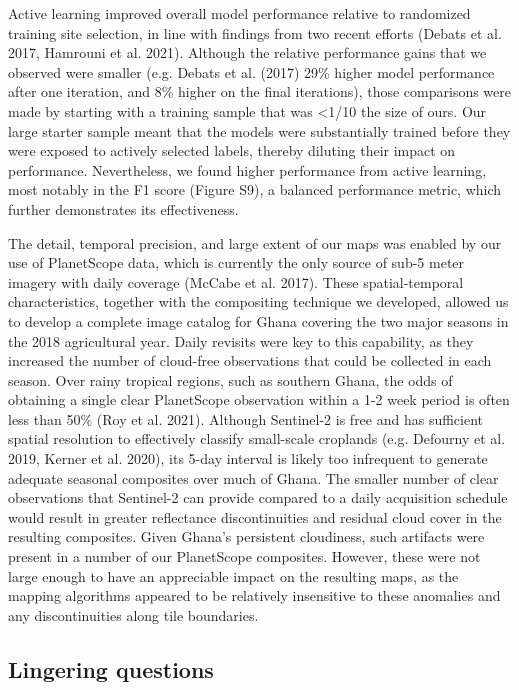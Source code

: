 \documentclass[11pt,a4paper]{article}
\begin{document}
Active learning improved overall model performance relative to
randomized training site selection, in line with findings from two
recent efforts (Debats et al. 2017, Hamrouni et al. 2021). Although the
relative performance gains that we observed were smaller (e.g. Debats et
al. (2017) 29\% higher model performance after one iteration, and 8\%
higher on the final iterations), those comparisons were made by starting
with a training sample that was \textless1/10 the size of ours. Our
large starter sample meant that the models were substantially trained
before they were exposed to actively selected labels, thereby diluting
their impact on performance. Nevertheless, we found higher performance
from active learning, most notably in the F1 score (Figure S9), a
balanced performance metric, which further demonstrates its
effectiveness.

The detail, temporal precision, and large extent of our maps was enabled
by our use of PlanetScope data, which is currently the only source of
sub-5 meter imagery with daily coverage (McCabe et al. 2017). These
spatial-temporal characteristics, together with the compositing
technique we developed, allowed us to develop a complete image catalog
for Ghana covering the two major seasons in the 2018 agricultural year.
Daily revisits were key to this capability, as they increased the number
of cloud-free observations that could be collected in each season. Over
rainy tropical regions, such as southern Ghana, the odds of obtaining a
single clear PlanetScope observation within a 1-2 week period is often
less than 50\% (Roy et al. 2021). Although Sentinel-2 is free and has
sufficient spatial resolution to effectively classify small-scale
croplands (e.g. Defourny et al. 2019, Kerner et al. 2020), its 5-day
interval is likely too infrequent to generate adequate seasonal
composites over much of Ghana. The smaller number of clear observations
that Sentinel-2 can provide compared to a daily acquisition schedule
would result in greater reflectance discontinuities and residual cloud
cover in the resulting composites. Given Ghana's persistent cloudiness,
such artifacts were present in a number of our PlanetScope composites.
However, these were not large enough to have an appreciable impact on
the resulting maps, as the mapping algorithms appeared to be relatively
insensitive to these anomalies and any discontinuities along tile
boundaries.

\hypertarget{lingering-questions}{%
\subsection{Lingering questions}\label{lingering-questions}}
\end{document}
